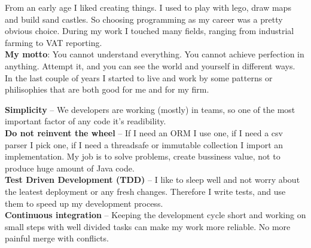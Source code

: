 \documentclass[9pt]{developercv} %
\begin{document}

\begin{minipage}[t]{0.48\textwidth} %
    \vspace{-\baselineskip} %
    From an early age I liked creating things. I used to play with lego, draw maps and build sand castles.
    So choosing programming as my career was a pretty obvious choice.
    During my work I touched many fields, ranging from industrial farming to VAT reporting. \\

    \textbf{My motto}:
    You cannot understand everything.
    You cannot achieve perfection in anything.
    Attempt it, and you can see the world and yourself in different ways. \\

    In the last couple of years I started to live and work by some patterns or philisophies that are both good for me and for my firm. \\
\end{minipage}
\hfill %
\begin{minipage}[t]{0.5\textwidth} %
    \vspace{-\baselineskip} %

    \textbf{Simplicity} -- We developers are working (mostly) in teams, so one of the most important factor of any code it's readibility. \\
    \textbf{Do not reinvent the wheel} -- If I need an ORM I use one,
    if I need a csv parser I pick one,
    if I need a threadsafe or immutable collection I import an implementation.
    My job is to solve problems, create bussiness value, not to produce huge amount of Java code.\\
    \textbf{Test Driven Development (TDD)} -- I like to sleep well and not worry about the leatest deployment or any fresh changes.
    Therefore I write tests, and use them to speed up my development process. \\
    \textbf{Continuous integration} -- Keeping the development cycle short and working on small steps with well divided tasks can make my work more reliable. No more painful merge with conflicts.\\
\end{minipage}
\end{document}
